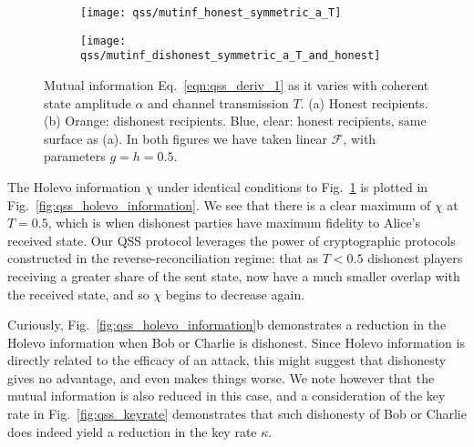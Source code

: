 \begin{figure}[htp]
\captionsetup{width=0.8\linewidth}
\centering
	\begin{subfigure}{0.49\linewidth}
	\centering
	\texttt{[image: qss/mutinf\_honest\_symmetric\_a\_T]}
	\caption{}
	\end{subfigure}
	\begin{subfigure}{0.49\linewidth}
	\centering
	\texttt{[image: qss/mutinf\_dishonest\_symmetric\_a\_T\_and\_honest]}
	\caption{}
	\end{subfigure}
\caption{\label{fig:qss_mutual_information} Mutual information Eq.~\ref{eqn:qss_deriv_1} as it varies with coherent state amplitude $\alpha$ and channel transmission $T$. (a) Honest recipients. (b) Orange: dishonest recipients. Blue, clear: honest recipients, same surface as (a). In both figures we have taken linear $\mathcal{F}$, with parameters $g = h = 0.5$.}
\end{figure}

The Holevo information $\chi$ under identical conditions to Fig.~\ref{fig:qss_mutual_information} is plotted in Fig.~\ref{fig:qss_holevo_information}. We see that there is a clear maximum of $\chi$ at $T = 0.5$, which is when dishonest parties have maximum fidelity to Alice's received state. Our QSS protocol leverages the power of cryptographic protocols constructed in the reverse-reconciliation regime: that as $T < 0.5$ dishonest players receiving a greater share of the sent state, now have a much smaller overlap with the received state, and so $\chi$ begins to decrease again.

Curiously, Fig.~\ref{fig:qss_holevo_information}b demonstrates a reduction in the Holevo information when Bob or Charlie is dishonest. Since Holevo information is directly related to the efficacy of an attack, this might suggest that dishonesty gives no advantage, and even makes things worse. We note however that the mutual information is also reduced in this case, and a consideration of the key rate in Fig.~\ref{fig:qss_keyrate} demonstrates that such dishonesty of Bob or Charlie does indeed yield a reduction in the key rate $\kappa$. %

